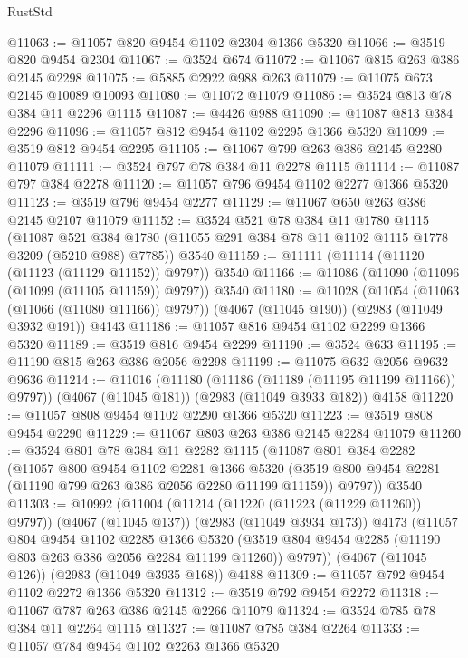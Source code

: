 \begin{lexlean}{RustStd}
\begin{coremodule}
@11063 := @11057 @820 @9454 @1102 @2304 @1366 @5320
@11066 := @3519 @820 @9454 @2304
@11067 := @3524 @674
@11072 := @11067 @815 @263 @386 @2145 @2298
@11075 := @5885 @2922 @988 @263
@11079 := @11075 @673 @2145 @10089 @10093
@11080 := @11072 @11079
@11086 := @3524 @813 @78 @384 @11 @2296 @1115
@11087 := @4426 @988
@11090 := @11087 @813 @384 @2296
@11096 := @11057 @812 @9454 @1102 @2295 @1366 @5320
@11099 := @3519 @812 @9454 @2295
@11105 := @11067 @799 @263 @386 @2145 @2280 @11079
@11111 := @3524 @797 @78 @384 @11 @2278 @1115
@11114 := @11087 @797 @384 @2278
@11120 := @11057 @796 @9454 @1102 @2277 @1366 @5320
@11123 := @3519 @796 @9454 @2277
@11129 := @11067 @650 @263 @386 @2145 @2107 @11079
@11152 := @3524
    @521
    @78
    @384
    @11
    @1780
    @1115
    (@11087 @521 @384 @1780 (@11055 @291 @384 @78 @11 @1102 @1115 @1778 @3209 (@5210 @988) @7785))
    @3540
@11159 := @11111 (@11114 (@11120 (@11123 (@11129 @11152)) @9797)) @3540
@11166 := @11086 (@11090 (@11096 (@11099 (@11105 @11159)) @9797)) @3540
@11180 := @11028
    (@11054 (@11063 (@11066 (@11080 @11166)) @9797))
    (@4067 (@11045 @190))
    (@2983 (@11049 @3932 @191))
    @4143
@11186 := @11057 @816 @9454 @1102 @2299 @1366 @5320
@11189 := @3519 @816 @9454 @2299
@11190 := @3524 @633
@11195 := @11190 @815 @263 @386 @2056 @2298
@11199 := @11075 @632 @2056 @9632 @9636
@11214 := @11016
    (@11180 (@11186 (@11189 (@11195 @11199 @11166)) @9797))
    (@4067 (@11045 @181))
    (@2983 (@11049 @3933 @182))
    @4158
@11220 := @11057 @808 @9454 @1102 @2290 @1366 @5320
@11223 := @3519 @808 @9454 @2290
@11229 := @11067 @803 @263 @386 @2145 @2284 @11079
@11260 := @3524
    @801
    @78
    @384
    @11
    @2282
    @1115
    (@11087
      @801
      @384
      @2282
      (@11057
        @800
        @9454
        @1102
        @2281
        @1366
        @5320
        (@3519 @800 @9454 @2281 (@11190 @799 @263 @386 @2056 @2280 @11199 @11159))
        @9797))
    @3540
@11303 := @10992
    (@11004
      (@11214 (@11220 (@11223 (@11229 @11260)) @9797))
      (@4067 (@11045 @137))
      (@2983 (@11049 @3934 @173))
      @4173
      (@11057
        @804
        @9454
        @1102
        @2285
        @1366
        @5320
        (@3519 @804 @9454 @2285 (@11190 @803 @263 @386 @2056 @2284 @11199 @11260))
        @9797))
    (@4067 (@11045 @126))
    (@2983 (@11049 @3935 @168))
    @4188
@11309 := @11057 @792 @9454 @1102 @2272 @1366 @5320
@11312 := @3519 @792 @9454 @2272
@11318 := @11067 @787 @263 @386 @2145 @2266 @11079
@11324 := @3524 @785 @78 @384 @11 @2264 @1115
@11327 := @11087 @785 @384 @2264
@11333 := @11057 @784 @9454 @1102 @2263 @1366 @5320

\end{coremodule}
\end{lexlean}
